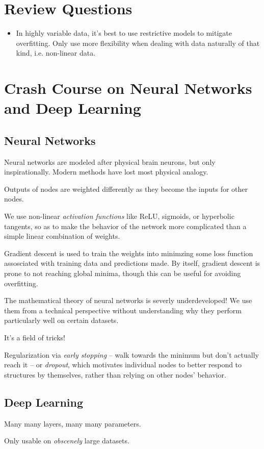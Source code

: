 \documentclass[11pt]{article}
\begin{document}
\section*{Review Questions}
\label{sec-4}
\begin{itemize}
\item In highly variable data, it's best to use restrictive models to mitigate overfitting. Only use more flexibility when dealing with data naturally of that kind, i.e. non-linear data.
\end{itemize}
\section*{Crash Course on Neural Networks and Deep Learning}
\label{sec-5}
\subsection*{Neural Networks}
\label{sec-5-1}
Neural networks are modeled after physical brain neurons, but only inspirationally. Modern methods have lost most physical analogy.

Outputs of nodes are weighted differently as they become the inputs for other nodes.

We use non-linear \emph{activation functions} like ReLU, sigmoids, or hyperbolic tangents, so as to make the behavior of the network more complicated than a simple linear combination of weights.

Gradient descent is used to train the weights into minimzing some loss function assosciated with training data and predictions made. By itself, gradient descent is prone to not reaching global minima, though this can be useful for avoiding overfitting.

The mathematical theory of neural networks is severly underdeveloped! We use them from a technical perspective without understanding why they perform particularly well on certain datasets.

It's a field of tricks!

Regularization via \emph{early stopping} -- walk towards the minimum but don't actually reach it -- or \emph{dropout}, which motivates individual nodes to better respond to structures by themselves, rather than relying on other nodes'  behavior.

\subsection*{Deep Learning}
\label{sec-5-2}
Many many layers, many many parameters.

Only usable on \emph{obscenely} large datasets.
\end{document}

